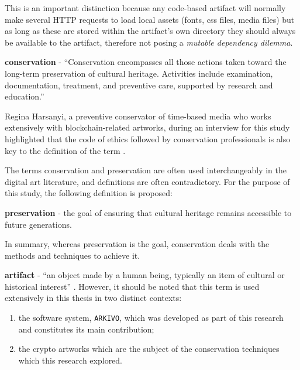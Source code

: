 \vspace{0.5cm}

This is an important distinction because any code-based artifact will normally make several HTTP requests to load local assets (fonts, css files, media files) but as long as these are stored within the artifact's own directory they should always be available to the artifact, therefore not posing a \emph{mutable dependency dilemma}.

\vspace{0.5cm}

\textbf{conservation} - ``Conservation encompasses all those actions taken toward the long-term preservation of cultural heritage. Activities include examination, documentation, treatment, and preventive care, supported by research and education.''  \cite{WhatConservation}

\vspace{0.5cm}

Regina Harsanyi, a preventive conservator of time-based media who works extensively with blockchain-related artworks, during an interview for this study highlighted that the code of ethics followed by conservation professionals is also key to the definition of the term \cite{americaninstituteforconservationCodeEthicsGuidelines}.

\vspace{0.5cm}

The terms conservation and preservation are often used interchangeably in the digital art literature, and definitions are often contradictory. For the purpose of this study, the following definition is proposed:

\vspace{0.5cm}
\textbf{preservation} - the goal of ensuring that cultural heritage remains accessible to future generations.

\vspace{0.5cm}

In summary, whereas preservation is the goal, conservation deals with the methods and techniques to achieve it.

\vspace{0.5cm}

\textbf{artifact} - ``an object made by a human being, typically an item of cultural or historical interest'' \cite{OxfordAdvancedLearner}. However, it should be noted that this term is used extensively in this thesis in two distinct contexts:

\begin{enumerate}
    \item the software system, \texttt{ARKIVO}, which was developed as part of this research and constitutes its main contribution;
    \item the crypto artworks which are the subject of the conservation techniques which this research explored.
\end{enumerate}

